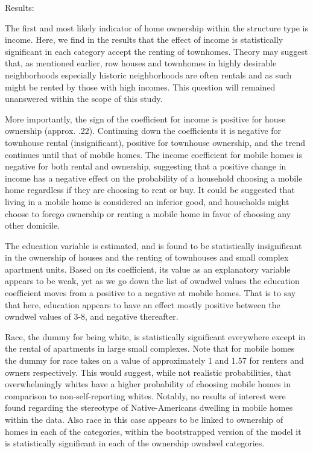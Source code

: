 \documentclass{article}
\begin{document}
Results:

The first and most likely indicator of home ownership within the structure type is income.  Here, we find in the results that the effect of income is statistically significant in each category accept the renting of townhomes.  Theory may suggest that, as mentioned earlier, row houses and townhomes in highly desirable neighborhoods especially historic neighborhoods are often rentals and as such might be rented by those with high incomes.  This question will remained unanswered within the scope of this study. 

 More importantly, the sign of the coefficient for income is positive for house ownership (approx. .22).  Continuing down the coefficients it is negative for townhouse rental (insignificant), positive for townhouse ownership, and the trend continues until that of mobile homes.  The income coefficient for mobile homes is negative for both rental and ownership, suggesting that a positive change in income has a negative effect on the probability of a household choosing a mobile home regardless if they are choosing to rent or buy.  It could be suggested that living in a mobile home is considered an inferior good, and households might choose to forego ownership or renting a mobile home in favor of choosing any other domicile.
 
The education variable is estimated, and is found to be statistically insignificant in the ownership of houses and the renting of townhouses and small complex apartment units.  Based on its coefficient, its value as an explanatory variable appears to be weak, yet as we go down the list of owndwel values the education coefficient moves from a positive to a negative at mobile homes. That is to say that here, education appears to have an effect mostly positive between the owndwel values of 3-8, and negative thereafter.

Race, the dummy for being white, is statistically significant everywhere except in the rental of apartments in large small complexes.  Note that for mobile homes the dummy for race takes on a value of approximately 1 and 1.57 for renters and owners respectively.  This would suggest, while not realistic probabilities, that overwhelmingly whites have a higher probability of choosing mobile homes in comparison to non-self-reporting whites.  Notably, no results of interest were found regarding the stereotype of Native-Americans dwelling in mobile homes within the data.  Also race in this case appears to be linked to ownership of homes in each of the categories, within the bootstrapped version of the model it is statistically significant in each of the ownership owndwel categories.  
\end{document}
